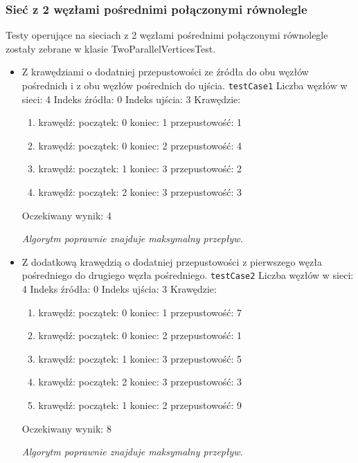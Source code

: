 \subsubsection{Sieć z 2 węzłami pośrednimi połączonymi równolegle}
Testy operujące na sieciach z 2 węzłami pośrednimi połączonymi równolegle zostały
zebrane w klasie TwoParallelVerticesTest.
\begin{itemize}[nosep]
    \item Z krawędziami o dodatniej przepustowości ze źródła do obu węzłów
    pośrednich i z obu węzłów pośrednich do ujścia.
    \texttt{testCase1}
    Liczba węzłów w sieci: 4
    Indeks źródła: 0
    Indeks ujścia: 3
    Krawędzie:
    \begin{enumerate}[nosep]
        \item krawędź:
        początek: 0
        koniec: 1
        przepustowość: 1
        \item krawędź:
        początek: 0
        koniec: 2
        przepustowość: 4
        \item krawędź:
        początek: 1
        koniec: 3
        przepustowość: 2
        \item krawędź:
        początek: 2
        koniec: 3
        przepustowość: 3
    \end{enumerate}
    Oczekiwany wynik: 4

    \emph{Algorytm poprawnie znajduje maksymalny przepływ.}

    \item Z dodatkową krawędzią o dodatniej przepustowości z pierwszego węzła
    pośredniego do drugiego węzła pośredniego.
    \texttt{testCase2}
    Liczba węzłów w sieci: 4
    Indeks źródła: 0
    Indeks ujścia: 3
    Krawędzie:
    \begin{enumerate}[nosep]
        \item krawędź:
        początek: 0
        koniec: 1
        przepustowość: 7
        \item krawędź:
        początek: 0
        koniec: 2
        przepustowość: 1
        \item krawędź:
        początek: 1
        koniec: 3
        przepustowość: 5
        \item krawędź:
        początek: 2
        koniec: 3
        przepustowość: 3
        \item krawędź:
        początek: 1
        koniec: 2
        przepustowość: 9
    \end{enumerate}
    Oczekiwany wynik: 8

    \emph{Algorytm poprawnie znajduje maksymalny przepływ.}


\end{itemize}
